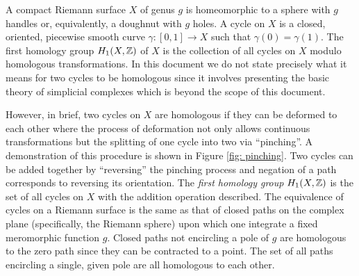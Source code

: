 A compact Riemann surface $X$ of genus $g$ is homeomorphic to a sphere with $g$
handles or, equivalently, a doughnut with $g$ holes. A cycle on $X$ is a closed,
oriented, piecewise smooth curve $\gamma : [0,1] \to X$ such that $\gamma(0) =
\gamma(1)$. The first homology group $H_1(X,\operatorname{\mathbb{Z}})$ of $X$ is the collection of
all cycles on $X$ modulo homologous transformations. In this document we do not
state precisely what it means for two cycles to be homologous since it involves
presenting the basic theory of simplicial complexes which is beyond the scope of
this document.

However, in brief, two cycles on $X$ are homologous if they can be deformed to
each other where the process of deformation not only allows continuous
transformations but the splitting of one cycle into two via ``pinching''. A
demonstration of this procedure is shown in Figure \ref{fig: pinching}. Two
cycles can be added together by ``reversing'' the pinching process and negation
of a path corresponds to reversing its orientation. The {\it first homology
  group} $H_1(X,\operatorname{\mathbb{Z}})$ is the set of all cycles on $X$ with the addition
operation described. The equivalence of cycles on a Riemann surface is the same
as that of closed paths on the complex plane (specifically, the Riemann sphere)
upon which one integrate a fixed meromorphic function $g$. Closed paths not
encircling a pole of $g$ are homologous to the zero path since they can be
contracted to a point. The set of all paths encircling a single, given pole are
all homologous to each other.


